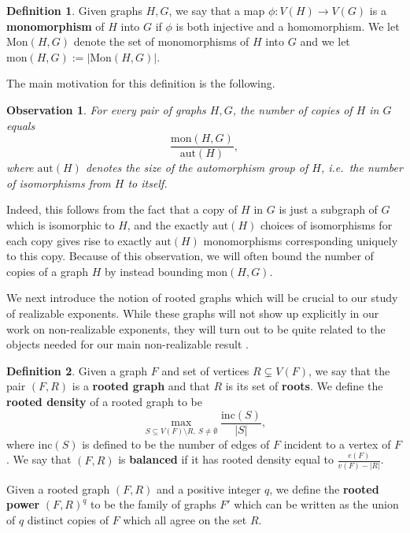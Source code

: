 \documentclass[12pt,letterpaper]{article}
\newtheorem{observation}[theorem]{Observation}
\theoremstyle{definition}
\newtheorem{definition}{Definition}
\newcommand{\pow}{q} %
\newcommand{\sm}{\setminus}
\newcommand{\sub}{\subseteq}
\newcommand{\mon}{\mathrm{mon}}
\newcommand{\Mon}{\mathrm{Mon}}
\begin{document}
	\begin{definition}
		Given graphs $H,G$, we say that a map  $\phi:V(H)\to V(G)$ is a \textbf{monomorphism} of $H$ into $G$ if $\phi$ is both injective and a homomorphism.  We let $\Mon(H,G)$ denote the set of monomorphisms of $H$ into $G$ and we let $\mon(H,G):=|\Mon(H,G)|$.
	\end{definition}
	The main motivation for this definition is the following.
	\begin{observation}\label{observation monomorphisms same as copies}
		For every pair of graphs $H,G$, the number of copies of $H$ in $G$ equals
		\[\frac{\mon(H,G)}{\mathrm{aut}(H)},\]
		where $\mathrm{aut}(H)$ denotes the size of the automorphism group of $H$, i.e.\ the number of isomorphisms from $H$ to itself.
	\end{observation}
	Indeed, this follows from the fact that a copy of $H$ in $G$ is just a subgraph of $G$ which is isomorphic to $H$, and the exactly $\mathrm{aut}(H)$ choices of isomorphisms for each copy gives rise to exactly $\mathrm{aut}(H)$ monomorphisms corresponding uniquely to this copy.  Because of this observation, we will often bound the number of copies of a graph $H$ by instead bounding $\mon(H,G)$.
	
	
	We next introduce the notion of rooted graphs which will be crucial to our study of realizable exponents.  While these graphs will not show up explicitly in our work on non-realizable exponents, they will turn out to be quite related to the objects needed for our main non-realizable result .
	
	\begin{definition}
		Given a graph $F$ and set of vertices $R\subsetneq V(F)$, we say that the pair $(F,R)$ is a \textbf{rooted graph} and that $R$ is its set of \textbf{roots}.  We define the \textbf{rooted density} of a rooted graph to be
		\[
		\max_{S\sub V(F)\sm R,\ S\ne \emptyset}\frac{\mathrm{inc}(S)}{|S|},
		\]
		where $\mathrm{inc}(S)$ is defined to be the number of edges of $F$ incident to a vertex of $F$.  We say that $(F,R)$ is \textbf{balanced} if it has rooted density equal to $\frac{e(F)}{v(F)-|R|}$.
		
		Given a rooted graph $(F,R)$ and a positive integer $\pow$, we define the \textbf{rooted power} $(F,R)^\pow$ to be the family of graphs $F'$ which can be written as the union of $\pow$ distinct copies of $F$ which all agree on the set $R$. 
	\end{definition}
	
\end{document}
